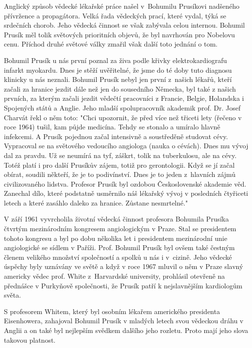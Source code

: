 \documentclass[../dejiny-rodu-prusiku.tex]{subfiles}
\begin{document}
Anglický způsob vědecké lékařské práce našel v Bohumilu Prusíkovi nadšeného přívržence a propagátora. Velká řada vědeckých prací, které vydal, týká se srdečních chorob. Jeho vědecká činnost se však zabývala celou internou. Bohumil Prusík měl tolik světových prioritních objevů, že byl navrhován pro Nobelovu cenu. Příchod druhé světové války zmařil však další toto jednání o tom.

Bohumil Prusík u nás první poznal za živa podle křivky elektrokardiografu infarkt myokardu. Dnes je stěží uvě­řitelné, že jsme do té doby tuto diagnosu klinicky u nás neznali. Bohumil Prusík nebyl jen první z našich lékařů, kteří začali za hranice jezdit dále než jen do sousedního Německa, byl také z našich prvních, za kterým začali jezdit vědečtí pracovníci z Francie, Belgie, Holandska i Spojených států a Anglie. Jeho mladší spolupracovník akademik prof. Dr. Josef Char­vát řekl o něm toto: "Chci upozornit, že před více než třiceti lety (řečeno v roce 1964) tušil, kam půjde medicína. Tehdy se stonalo a umíralo hlavně infekcemi. A Prusík pojednou začal intensivně a soustředěně stu­dovat cévy. Vypracoval se na světového vedoucího angiologa (nauka o cévách). Dnes mu vývoj dal za pravdu. Už se neumírá na tyf, záškrt, tolik na tuberkulosu, ale na cévy. Totéž platí i pro další Prusíkův zájem, totiž pro gerontologii. Když se jí začal obírat, soudili někte­ří, že je to podivínství. Dnes je to jeden z hlavních zájmů civilizovaného lidstva. Profesor Prusík byl ozdobou Československé akademie věd. Zanechal dílo, které podstatně usměrnilo náš lékařský vývoj v posledních čtyřiceti letech a které zasáhlo daleko za hra­nice. Zůstane nesmrtelné."

V září 1961 vyvrcholila životní vědecká činnost profesora Bohumila Prusíka čtvrtým mezinárodním kongresem angiologickým v Praze. Stal se presidentem tohoto kongresu a byl po dobu několika let i presidentem mezinárodní unie angiologické se sídlem v Paříži. Prof. Bohumil Prusík byl ovšem také čestným členem velikého množství společností a spolků u nás i v cizině. Jeho vědecké úspě­chy byly uznávány ve světě a když v roce 1967 mluvil o něm v Praze slavný americky vědec prof. White z Harvardské university, prohlásil otevřeně na přednášce v Purkyňově společnosti, že Prusík patří k nejslavnějším kardiologům světa.

S profesorem Whitem, který byl osobním lékařem americké­ho presidenta Eisenhowera, zahajoval Bohumil Prusík v mladých letech svou vědeckou dráhu v Anglii a on také byl nejlepším svědkem dalšího jeho rozletu. Proto mají jeho slova takovou platnost.
\end{document}
